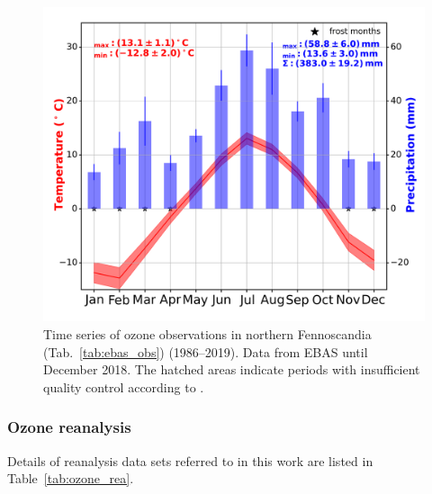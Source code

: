 \documentclass[bg, manuscript]{copernicus}
\begin{document}
\begin{figure}[t]
  \includegraphics[width=12cm]{fig04}
  \caption{Time series of ozone observations in northern Fennoscandia (Tab.~\ref{tab:ebas_obs}) (1986--2019). Data from EBAS until December 2018. The hatched areas indicate periods with insufficient quality control according to \citet{NILU2003}.}
  \label{fig:ozone_timesseries_fenoscandic_obs}
\end{figure}

\subsubsection{Ozone reanalysis}
\label{subsubsec:ozone_rea}

Details of reanalysis data sets referred to in this work are listed in Table~\ref{tab:ozone_rea}.
\end{document}
